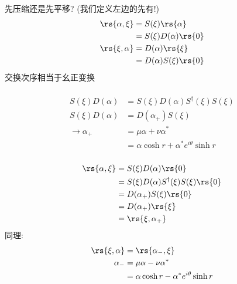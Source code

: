    \begin{frame}
    \frametitle{}
         先压缩还是先平移? (我们定义左边的先有!)
         \[\begin{aligned}
            \rs{\alpha,\xi } &= S(\xi) \rs{\alpha } \\ 
            &=  S(\xi) D(\alpha) \rs{0} \\
            \rs{\xi, \alpha} &= D(\alpha) \rs{\xi } \\ 
            &=   D(\alpha) S(\xi)\rs{0} \\
        \end{aligned} \]
        交换次序相当于幺正变换 \\ 
        \证~ 
        \[\begin{aligned}
            S(\xi) D(\alpha) & = S(\xi) D(\alpha)S^\dagger (\xi) S(\xi) \\ 
            S(\xi) D(\alpha) & =  D(\alpha_{+}) S(\xi) \\ 
            \to  \alpha_{+ } &= \mu\alpha  +  \nu \alpha^{*} \\ 
            &= \alpha \cosh r + \alpha^{*} e^{i \theta} \sinh r
        \end{aligned} \]
    \end{frame}


    \begin{frame}
     \frametitle{} 

        \[\begin{aligned}
            \rs{\alpha,\xi } & = S(\xi) D(\alpha) \rs{0}  \\ 
            &= S(\xi) D(\alpha)S^\dagger (\xi) S(\xi) \rs{0} \\ 
            &= D(\alpha_{+}) S(\xi) \rs{0} \\ 
            &= D(\alpha_{+}) \rs{\xi} \\ 
            &= \rs{\xi, \alpha_{+}} 
        \end{aligned} \]
        同理: 
        \[\begin{aligned}
            \rs{\xi, \alpha }& = \rs{\alpha_{-},\xi} \\ 
            \alpha_{- } &= \mu\alpha  -  \nu \alpha^{*} \\ 
            &= \alpha \cosh r - \alpha^{*} e^{i \theta} \sinh r
        \end{aligned} \]
    \end{frame}
    
